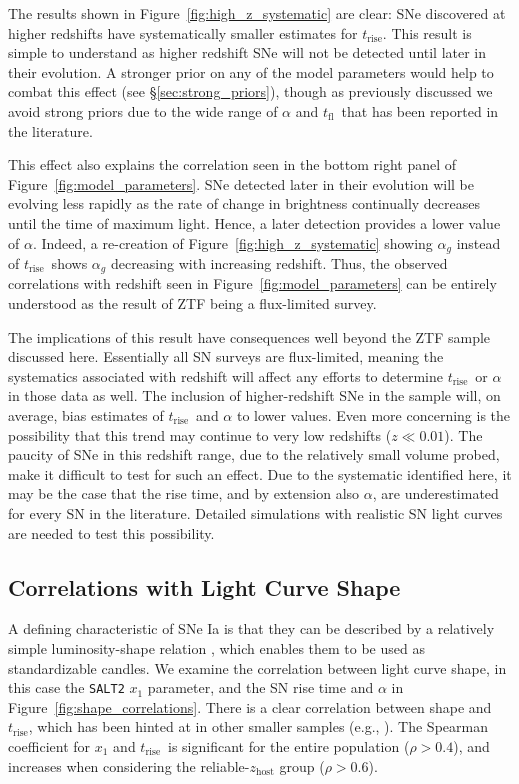 \documentclass[twocolumn]{./aastex63}
\newcommand{\tfl}{$t_\mathrm{fl}$}
\newcommand{\trise}{$t_\mathrm{rise}$}
\begin{document}
The results shown in Figure~\ref{fig:high_z_systematic} are clear: SNe
discovered at higher redshifts have systematically smaller estimates for
\trise. This result is simple to understand as higher redshift SNe will not be
detected until later in their evolution. A stronger prior on any of the model
parameters would help to combat this effect (see \S\ref{sec:strong_priors}),
though as previously discussed we avoid strong priors due to the wide range of
$\alpha$ and \tfl\ that has been reported in the literature. 

This effect also explains the correlation seen in the bottom right panel of
Figure~\ref{fig:model_parameters}. SNe detected later in their evolution will
be evolving less rapidly as the rate of change in brightness continually
decreases until the time of maximum light. Hence, a later detection provides a
lower value of $\alpha$. Indeed, a re-creation of
Figure~\ref{fig:high_z_systematic} showing $\alpha_g$ instead of \trise\ shows
$\alpha_g$ decreasing with increasing redshift. Thus, the observed
correlations with redshift seen in Figure~\ref{fig:model_parameters} can be
entirely understood as the result of ZTF being a flux-limited survey.

The implications of this result have consequences well beyond the ZTF sample
discussed here. Essentially all SN surveys are flux-limited, meaning the
systematics associated with redshift will affect any efforts to determine
\trise\ or $\alpha$ in those data as well. The inclusion of higher-redshift
SNe in the sample will, on average, bias estimates of \trise\ and $\alpha$ to
lower values. Even more concerning is the possibility that this trend may
continue to very low redshifts ($z \ll 0.01$). The paucity of SNe in this
redshift range, due to the relatively small volume probed, make it difficult
to test for such an effect. Due to the systematic identified here, it may be
the case that the rise time, and by extension also $\alpha$, are
underestimated for every SN in the literature. Detailed simulations with
realistic SN light curves are needed to test this possibility.

\subsection{Correlations with Light Curve Shape}

A defining characteristic of SNe Ia is that they can be described by a
relatively simple luminosity-shape relation \citep{Phillips93}, which enables
them to be used as standardizable candles. We examine the correlation between
light curve shape, in this case the \texttt{SALT2} $x_1$ parameter, and the SN
rise time and $\alpha$ in Figure~\ref{fig:shape_correlations}. There is a clear
correlation between shape and \trise, which has been hinted at in other smaller
samples (e.g., \citealt{Riess99a,Firth15,Zheng17a}). The Spearman coefficient
for $x_1$ and \trise\ is significant for the entire population ($\rho > 0.4$),
and increases when considering the reliable-$z_\mathrm{host}$ group ($\rho >
0.6$).
\end{document}

